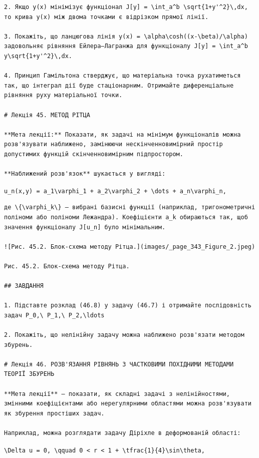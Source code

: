 \documentclass[
  ukrainian,
]{article}
\begin{document}
\begin{verbatim}
2. Якщо y(x) мінімізує функціонал J[y] = \int_a^b \sqrt{1+y'^2}\,dx, то крива y(x) між двома точками є відрізком прямої лінії.

3. Покажіть, що ланцюгова лінія y(x) = \alpha\cosh((x-\beta)/\alpha) задовольняє рівняння Ейлера–Лагранжа для функціоналу J[y] = \int_a^b y\sqrt{1+y'^2}\,dx.

4. Принцип Гамільтона стверджує, що матеріальна точка рухатиметься так, що інтеграл дії буде стаціонарним. Отримайте диференціальне рівняння руху матеріальної точки.

# Лекція 45. МЕТОД РІТЦА

**Мета лекції:** Показати, як задачі на мінімум функціоналів можна розв'язувати наближено, замінюючи нескінченновимірний простір допустимих функцій скінченновимірним підпростором.

**Наближений розв'язок** шукається у вигляді:
\end{verbatim}

\texttt{u\_n(x,y)\ =\ a\_1\textbackslash{}varphi\_1\ +\ a\_2\textbackslash{}varphi\_2\ +\ \textbackslash{}dots\ +\ a\_n\textbackslash{}varphi\_n,}

\begin{verbatim}
де \{\varphi_k\} — вибрані базисні функції (наприклад, тригонометричні поліноми або поліноми Лежандра). Коефіцієнти a_k обираються так, щоб значення функціоналу J[u_n] було мінімальним.

![Рис. 45.2. Блок-схема методу Рітца.](images/_page_343_Figure_2.jpeg)

Рис. 45.2. Блок-схема методу Рітца.

## ЗАВДАННЯ

1. Підставте розклад (46.8) у задачу (46.7) і отримайте послідовність задач P_0,\ P_1,\ P_2,\ldots

2. Покажіть, що нелінійну задачу можна наближено розв'язати методом збурень.

# Лекція 46. РОЗВ'ЯЗАННЯ РІВНЯНЬ З ЧАСТКОВИМИ ПОХІДНИМИ МЕТОДАМИ ТЕОРІЇ ЗБУРЕНЬ

**Мета лекції** — показати, як складні задачі з нелінійностями, змінними коефіцієнтами або нерегулярними областями можна розв'язувати як збурення простіших задач.

Наприклад, можна розглядати задачу Діріхле в деформованій області:
\end{verbatim}

\texttt{\textbackslash{}Delta\ u\ =\ 0,\ \textbackslash{}qquad\ 0\ \textless{}\ r\ \textless{}\ 1\ +\ \textbackslash{}tfrac\{1\}\{4\}\textbackslash{}sin\textbackslash{}theta,}
\end{document}
